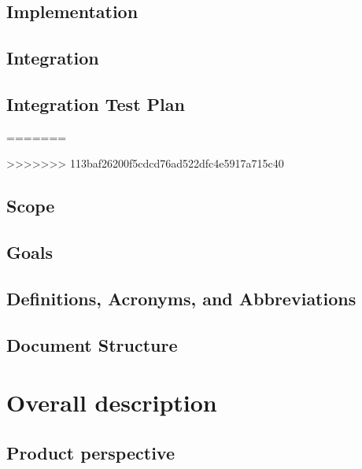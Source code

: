 \documentclass[12pt, a4paper]{report}
\begin{document}
\section{Implementation}


\section{Integration}


\section{Integration Test Plan}


=======

>>>>>>> 113baf26200f5cdcd76ad522dfc4e5917a715c40

\section{Scope}


\section{Goals}


\section{Definitions, Acronyms, and Abbreviations}


\section{Document Structure}


\chapter{Overall description}
\label{ch:overall-desc}

\section{Product perspective}

\end{document}
